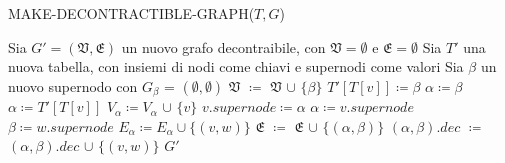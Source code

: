 \begin{algorithm}[H] 
    \caption{MAKE-DECONTRACTIBLE-GRAPH($T,G$)}\label{alg:make-decontractible-graph}
    \begin{algorithmic}[1]
        \State Sia $G' = (\mathfrak{V}, \mathfrak{E})$ un nuovo grafo decontraibile, con $\mathfrak{V} = \emptyset$
                e $\mathfrak{E} = \emptyset$
        \State Sia $T\mathcal{'}$ una nuova tabella, con insiemi di nodi come chiavi e supernodi come valori
                \State Sia $\beta$ un nuovo supernodo con $G_{\beta}$ = $(\emptyset, \emptyset)$
                \State $\mathfrak{V}$ $\coloneqq$ $\mathfrak{V}$ $\cup$ $\{\beta\}$
                \State $T'[T[v]] \coloneqq \beta$
                \State $\alpha \coloneqq \beta$
            \Else
                \State $\alpha \coloneqq T'[T[v]]$
            \EndIf
            \State $V_{\alpha} \coloneqq V_{\alpha}$ $\cup$ $\{v\}$
            \State $v.supernode \coloneqq \alpha$
        \EndFor
            \State $\alpha \coloneqq v.supernode$
            \State $\beta \coloneqq w.supernode$
            \If {$(\alpha == \beta )$}
                \State $E_{\alpha} \coloneqq E_{\alpha} \cup \{(v,w)\}$
            \Else
                    \State $\mathfrak{E}$ $\coloneqq$ $\mathfrak{E}$ $\cup$ $\{(\alpha , \beta)\}$
                \EndIf
                \State $(\alpha , \beta).dec$ $\coloneqq$ $(\alpha , \beta).dec$ $\cup$ $\{(v, w)\}$
            \EndIf
        \EndFor
        \State \Return $G'$
    \end{algorithmic}
\end{algorithm}